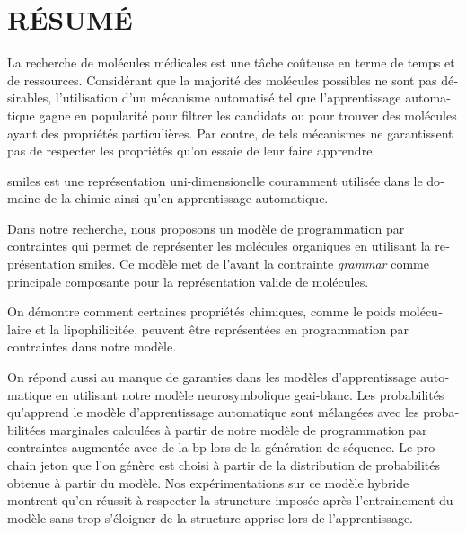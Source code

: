\documentclass[../Document.tex]{subfiles}
\begin{document}
%
\chapter*{RÉSUMÉ}\thispagestyle{headings}

\begin{otherlanguage}{french}
La recherche de molécules médicales est une tâche coûteuse en terme de temps et de ressources.
Considérant que la majorité des molécules possibles ne sont pas désirables, l'utilisation d'un mécanisme automatisé tel que l'apprentissage automatique gagne en popularité pour filtrer les candidats ou pour trouver des molécules ayant des propriétés particulières.
Par contre, de tels mécanismes ne garantissent pas de respecter les propriétés qu'on essaie de leur faire apprendre.

\acrshort{smiles} est une représentation uni-dimensionelle couramment utilisée dans le domaine de la chimie ainsi qu'en apprentissage automatique. 

Dans notre recherche, nous proposons un modèle de programmation par contraintes qui permet de représenter les molécules organiques en utilisant la représentation \acrshort{smiles}. Ce modèle met de l'avant la contrainte \textit{grammar} comme principale composante pour la représentation valide de molécules.

On démontre comment certaines propriétés chimiques, comme le poids moléculaire et la lipophilicitée, peuvent être représentées en programmation par contraintes dans notre modèle.

On répond aussi au manque de garanties dans les modèles d'apprentissage automatique en utilisant notre modèle neurosymbolique \acrshort{geai-blanc}.
Les probabilités qu'apprend le modèle d'apprentissage automatique sont mélangées avec les probabilitées marginales calculées à partir de notre modèle de programmation par contraintes augmentée avec de la \acrshort{bp} lors de la génération de séquence.
Le prochain jeton que l'on génère est choisi à partir de la distribution de probabilités obtenue à partir du modèle.
Nos expérimentations sur ce modèle hybride montrent qu'on réussit à respecter la struncture imposée après l'entrainement du modèle sans trop s'éloigner de la structure apprise lors de l'apprentissage.

\end{otherlanguage}
\end{document}
